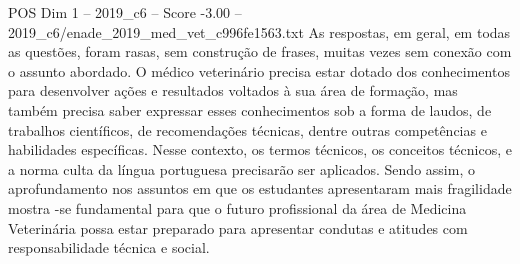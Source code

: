 \begin{textsample}{POS Dim 1 – 2019\_c6 – Score -3.00 – 2019\_c6/enade\_2019\_med\_vet\_c996fe1563.txt}
As respostas, em geral, em todas as questões, foram rasas, sem construção de frases, muitas vezes sem conexão com o assunto abordado.
O médico veterinário precisa estar dotado dos conhecimentos para desenvolver ações e resultados voltados à sua área de formação, mas também precisa saber expressar esses conhecimentos sob a forma de laudos, de trabalhos científicos, de recomendações técnicas, dentre outras competências e habilidades específicas.
Nesse contexto, os termos técnicos, os conceitos técnicos, e a norma culta da língua portuguesa precisarão ser aplicados.
Sendo assim, o aprofundamento nos assuntos em que os estudantes apresentaram mais fragilidade mostra -se fundamental para que o futuro profissional da área de Medicina Veterinária possa estar preparado para apresentar condutas e atitudes com responsabilidade técnica e social.

\end{textsample}
